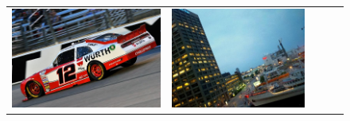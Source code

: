 \newcommand{\retrievalwidth}{0.12}
\begin{figure}[!ht]
\centering
\footnotesize
\setlength{\tabcolsep}{3pt}
\begin{tabular}{c|cccc}
\includegraphics[height=\retrievalwidth\linewidth]{figures/applications/matching_horizon_group_3/00021396_jpg_0_46409649747812576_original.jpg} &
\includegraphics[height=\retrievalwidth\linewidth]{figures/applications/matching_horizon_group_3/00016279_jpg_0_07618561060718712.jpg} &

\end{tabular}
\end{figure}
